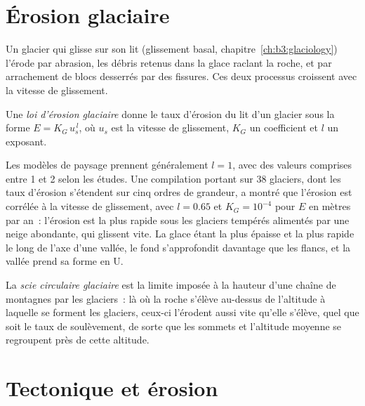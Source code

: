 \section{Érosion glaciaire}\label{sec:b3:quantitative-geomorphology:glacial}

Un glacier qui glisse sur son lit (glissement basal,
chapitre~\ref{ch:b3:glaciology}) l'érode par abrasion, les débris retenus dans la glace
raclant la roche, et par arrachement de blocs desserrés
par des fissures. Ces deux processus croissent avec la vitesse de glissement.

\begin{definition}\label{def:b3:quantitative-geomorphology:glacial}
Une \emph{loi d'érosion glaciaire} donne le taux d'érosion
du lit d'un glacier sous la forme $E = K_G\,u_s^{\,l}$, où $u_s$ est la
vitesse de glissement, $K_G$ un coefficient et $l$ un exposant.
\end{definition}

Les modèles de paysage prennent généralement $l = 1$, avec des valeurs comprises entre 1 et 2 selon les études.
Une compilation portant sur 38 glaciers, dont les taux d'érosion s'étendent sur cinq ordres
de grandeur, a montré que l'érosion est corrélée à la vitesse de glissement, avec $l = 0.65$ et
$K_G = 10^{-4}$ pour $E$ en mètres par an~: l'érosion est la plus rapide sous les glaciers tempérés
alimentés par une neige abondante, qui glissent vite. La glace étant la plus épaisse
et la plus rapide le long de l'axe d'une vallée, le fond s'approfondit davantage que les
flancs, et la vallée prend sa forme en U.

\begin{definition}\label{def:b3:quantitative-geomorphology:buzzsaw}
La \emph{scie circulaire glaciaire} est la limite imposée à la
hauteur d'une chaîne de montagnes par les glaciers~: là où la roche s'élève au-dessus de l'altitude
à laquelle se forment les glaciers, ceux-ci l'érodent aussi vite qu'elle s'élève, quel que soit le
taux de soulèvement, de sorte que les sommets et l'altitude moyenne se regroupent près de cette altitude.
\end{definition}

\section{Tectonique et érosion}\label{sec:b3:quantitative-geomorphology:tectonics}

